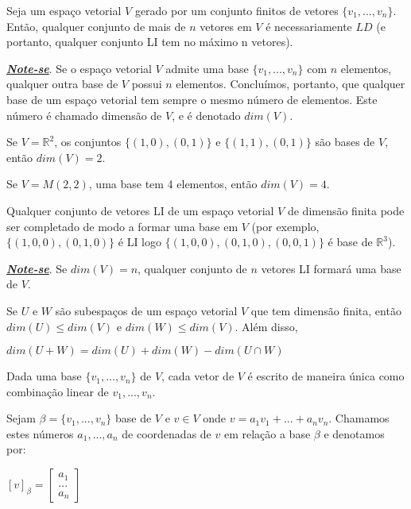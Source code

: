 \begin{teo}
	Seja um espaço vetorial $V$ gerado por um conjunto finitos de vetores $\{v_{1},...,v_{n}\}$. Então, qualquer conjunto de mais de $n$ vetores em $V$ é necessariamente $LD$ (e portanto, qualquer conjunto LI tem no máximo n vetores).	
\end{teo}
\underline{\textit{\textbf{Note-se}}}. Se o espaço vetorial $V$ admite uma base $\{v_{1},...,v_{n}\}$ com $n$ elementos, qualquer outra base de $V$ possui $n$ elementos. Concluímos, portanto, que qualquer base de um espaço vetorial tem sempre o mesmo número de elementos. Este número é chamado dimensão de $V$, e é denotado $dim(V)$.
\begin{ex}
Se $V=\mathbb{R}^{2}$, os conjuntos $\{(1,0),(0,1)\}$ e $\{(1,1),(0,1)\}$ são bases de $V$, então $dim(V)=2$.
\end{ex}
\begin{ex}
	Se $V=M(2,2)$, uma base tem 4 elementos, então $dim(V)=4$.
\end{ex} 
\begin{teo}
	Qualquer conjunto de vetores LI de um espaço vetorial $V$ de dimensão finita pode ser completado de modo a formar uma base em $V$ (por exemplo, $\{(1,0,0),(0,1,0)\}$ é LI logo $\{(1,0,0),(0,1,0),(0,0,1)\}$ é base de $\mathbb{R}^{3}$).	
\end{teo}
\underline{\textit{\textbf{Note-se}}}. Se $dim(V)=n$, qualquer conjunto de $n$ vetores LI formará uma base de $V$.
\begin{teo}
	Se $U$ e $W$ são subespaços de um espaço vetorial $V$ que tem dimensão finita, então $dim(U)\leqslant dim(V)$ e $dim(W)\leqslant dim(V)$. Além disso,
	
	 \begin{center}
	 	$dim(U+W)=dim(U)+dim(W)-dim(U\cap W)$
	 \end{center}
	
\end{teo}
\begin{teo}
	Dada uma base $\{v_{1},...,v_{n}\}$ de $V$, cada vetor de $V$ é escrito de maneira única como combinação linear de $v_{1},...,v_{n}$.
\end{teo}
\begin{df}
	Sejam $\beta=\{v_{1},...,v_{n}\}$ base de $V$ e $v\in V$ onde $v=a_{1}v_{1}+...+a_{n}v_{n}$. Chamamos estes números $a_{1},...,a_{n}$ de coordenadas de $v$ em relação a base $\beta$ e denotamos por:
	
	\begin{center}
		$[v]_{\beta}=\begin{bmatrix}
		a_{1}\\
		...\\
		a_{n}
	\end{bmatrix}$
	\end{center}
	  
\end{df}
